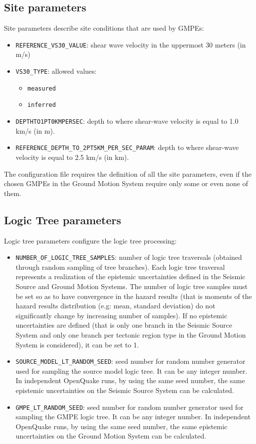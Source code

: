 \subsection{Site parameters}
Site parameters describe site conditions that are used by GMPEs:
\begin{itemize}
\item \Verb+REFERENCE_VS30_VALUE+: shear wave velocity in the uppermost 30 meters (in m/s)
\item \Verb+VS30_TYPE+: allowed values:
\begin{itemize}
\item \Verb+measured+
\item \Verb+inferred+
\end{itemize}
\item \Verb+DEPTHTO1PT0KMPERSEC+: depth to where shear-wave velocity is equal to 1.0 km/s (in m).
\item \Verb+REFERENCE_DEPTH_TO_2PT5KM_PER_SEC_PARAM+: depth to where shear-wave velocity is equal to 2.5 km/s (in km).
\end{itemize}
The configuration file requires the definition of all the site parameters, even if the chosen GMPEs in the Ground Motion System require only some or even none of them. 

\subsection{Logic Tree parameters}
Logic tree parameters configure the logic tree processing:
\begin{itemize}
\item \Verb+NUMBER_OF_LOGIC_TREE_SAMPLES+: number of logic tree traversals (obtained through random sampling of tree branches). Each logic tree traversal represents a realization of the epistemic uncertainties defined in the Seismic Source and Ground Motion Systems. The number of logic tree samples must be set so as to have convergence in the hazard results (that is moments of the hazard results distribution (e.g: mean, standard deviation) do not significantly change by increasing number of samples).  If no epistemic uncertainties are defined (that is only one branch in the Seismic Source System and only one branch per tectonic region type in the Ground Motion System is considered), it can be set to 1.
\item \Verb+SOURCE_MODEL_LT_RANDOM_SEED+: seed number for random number generator used for sampling the source model logic tree. It can be any integer number. In independent OpenQuake runs, by using the same seed number, the same epistemic uncertainties on the Seismic Source System can be calculated.
\item \Verb+GMPE_LT_RANDOM_SEED+: seed number for random number generator used for sampling the GMPE logic tree. It can be any integer number. In independent OpenQuake runs, by using the same seed number, the same epistemic uncertainties on the Ground Motion System can be calculated.
\end{itemize}

